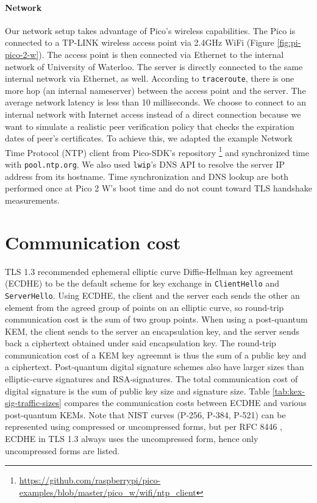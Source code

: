 \documentclass[letterpaper,12pt,titlepage,oneside,final]{book}
\begin{document}
\paragraph{Network} Our network setup takes advantage of Pico's wireless capabilities.
The Pico is connected to a TP-LINK wireless access point via 2.4GHz WiFi (Figure \ref{fig:pi-pico-2-w}).
The access point is then connected via Ethernet to the internal network of University of Waterloo.
The server is directly connected to the same internal network via Ethernet, as well.
According to \texttt{traceroute}, there is one more hop (an internal nameserver) between the access point and the server.
The average network latency is less than 10 milliseconds.
We choose to connect to an internal network with Internet access instead of a direct connection because we want to simulate a realistic peer verification policy that checks the expiration dates of peer's certificates.
To achieve this, we adapted the example Network Time Protocol (NTP) client from Pico-SDK's repository \footnote{\scriptsize \url{https://github.com/raspberrypi/pico-examples/blob/master/pico_w/wifi/ntp_client}} and synchronized time with \texttt{pool.ntp.org}.
We also used \texttt{lwip}'s DNS API to resolve the server IP address from its hostname.
Time synchronization and DNS lookup are both performed once at Pico 2 W's boot time and do not count toward TLS handshake measurements.

\section{Communication cost}\label{sec:communication-costs}
TLS 1.3 recommended ephemeral elliptic curve Diffie-Hellman key agreement (ECDHE) to be the default scheme for key exchange in \texttt{ClientHello} and \texttt{ServerHello}.
Using ECDHE, the client and the server each sends the other an element from the agreed group of points on an elliptic curve, so round-trip communication cost is the sum of two group points.
When using a post-quantum KEM, the client sends to the server an encapsulation key, and the server sends back a ciphertext obtained under said encapsulation key.
The round-trip communication cost of a KEM key agreemnt is thus the sum of a public key and a ciphertext.
Post-quantum digital signature schemes also have larger sizes than elliptic-curve signatures and RSA-signatures.
The total communication cost of digital signature is the sum of public key size and signature size.
Table \ref{tab:kex-sig-traffic-sizes} compares the communication costs between ECDHE and various post-quantum KEMs. Note that NIST curves (P-256, P-384, P-521) can be represented using compressed or uncompressed forms, but per RFC 8446 \cite{DBLP:journals/rfc/rfc8446}, ECDHE in TLS 1.3 always uses the uncompressed form, hence only uncompressed forms are listed.
\end{document}
